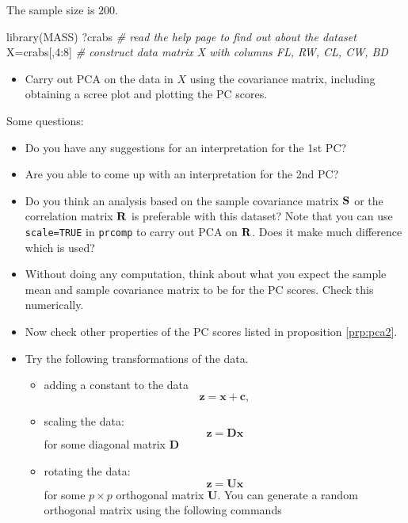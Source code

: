 \documentclass[
]{book}
\newenvironment{Shaded}{\begin{snugshade}}{\end{snugshade}}
\newcommand{\CommentTok}[1]{\textcolor[rgb]{0.56,0.35,0.01}{\textit{#1}}}
\newcommand{\DecValTok}[1]{\textcolor[rgb]{0.00,0.00,0.81}{#1}}
\newcommand{\FunctionTok}[1]{\textcolor[rgb]{0.00,0.00,0.00}{#1}}
\newcommand{\NormalTok}[1]{#1}
\newcommand{\OtherTok}[1]{\textcolor[rgb]{0.56,0.35,0.01}{#1}}
\newcommand{\SpecialCharTok}[1]{\textcolor[rgb]{0.00,0.00,0.00}{#1}}
\providecommand{\tightlist}{%
  \setlength{\itemsep}{0pt}\setlength{\parskip}{0pt}}
\theoremstyle{definition}
\theoremstyle{definition}
\theoremstyle{definition}
\theoremstyle{definition}
\theoremstyle{remark}
\begin{document}
The sample size is \(200\).

\begin{Shaded}
\begin{Highlighting}[]
\FunctionTok{library}\NormalTok{(MASS)}
\NormalTok{?crabs }\CommentTok{\# read the help page to find out about the dataset}
\NormalTok{X}\OtherTok{=}\NormalTok{crabs[,}\DecValTok{4}\SpecialCharTok{:}\DecValTok{8}\NormalTok{]     }
\CommentTok{\# construct data matrix X with columns FL, RW, CL, CW, BD}
\end{Highlighting}
\end{Shaded}

\begin{itemize}
\tightlist
\item
  Carry out PCA on the data in \(X\) using the covariance matrix, including obtaining a scree plot and plotting the PC scores.
\end{itemize}

Some questions:

\begin{itemize}
\item
  Do you have any suggestions for an interpretation for the 1st PC?
\item
  Are you able to come up with an interpretation for the 2nd PC?
\item
  Do you think an analysis based on the sample covariance matrix \({\bf S}\) or the
  correlation matrix \({\bf R}\) is preferable with this dataset? Note that you can use \texttt{scale=TRUE} in \texttt{prcomp}
  to carry out PCA on \({\bf R}\). Does it make much difference which is used?
\item
  Without doing any computation, think about what you expect the sample mean and sample covariance matrix to be for the PC scores. Check this numerically.
\item
  Now check other properties of the PC scores listed in proposition \ref{prp:pca2}.
\item
  Try the following transformations of the data.

  \begin{itemize}
  \item
    adding a constant to the data
    \[\mathbf z= \mathbf x+\mathbf c,\]
  \item
    scaling the data:
    \[\mathbf z= \mathbf D\mathbf x\]
    for some diagonal matrix \(\mathbf D\)
  \item
    rotating the data:
    \[\mathbf z= \mathbf U\mathbf x\]
    for some \(p\times p\) orthogonal matrix \(\mathbf U\).
    You can generate a random orthogonal matrix using the following commands
  \end{itemize}
\end{itemize}
\end{document}
